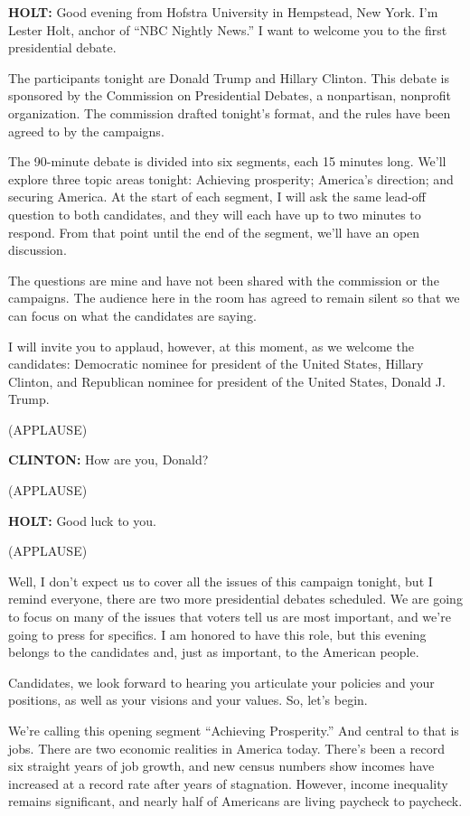 \textbf{HOLT:} Good evening from Hofstra University in Hempstead, New
York. I'm Lester Holt, anchor of ``NBC Nightly News.'' I want to welcome
you to the first presidential debate.

The participants tonight are Donald Trump and Hillary Clinton. This
debate is sponsored by the Commission on Presidential Debates, a
nonpartisan, nonprofit organization. The commission drafted tonight's
format, and the rules have been agreed to by the campaigns.

The 90-minute debate is divided into six segments, each 15 minutes long.
We'll explore three topic areas tonight: Achieving prosperity; America's
direction; and securing America. At the start of each segment, I will
ask the same lead-off question to both candidates, and they will each
have up to two minutes to respond. From that point until the end of the
segment, we'll have an open discussion.

The questions are mine and have not been shared with the commission or
the campaigns. The audience here in the room has agreed to remain silent
so that we can focus on what the candidates are saying.

I will invite you to applaud, however, at this moment, as we welcome the
candidates: Democratic nominee for president of the United States,
Hillary Clinton, and Republican nominee for president of the United
States, Donald J. Trump.

(APPLAUSE)

\textbf{CLINTON:} How are you, Donald?

(APPLAUSE)

\textbf{HOLT:} Good luck to you.

(APPLAUSE)

Well, I don't expect us to cover all the issues of this campaign
tonight, but I remind everyone, there are two more presidential debates
scheduled. We are going to focus on many of the issues that voters tell
us are most important, and we're going to press for specifics. I am
honored to have this role, but this evening belongs to the candidates
and, just as important, to the American people.

Candidates, we look forward to hearing you articulate your policies and
your positions, as well as your visions and your values. So, let's
begin.

We're calling this opening segment ``Achieving Prosperity.'' And central
to that is jobs. There are two economic realities in America today.
There's been a record six straight years of job growth, and new census
numbers show incomes have increased at a record rate after years of
stagnation. However, income inequality remains significant, and nearly
half of Americans are living paycheck to paycheck.


